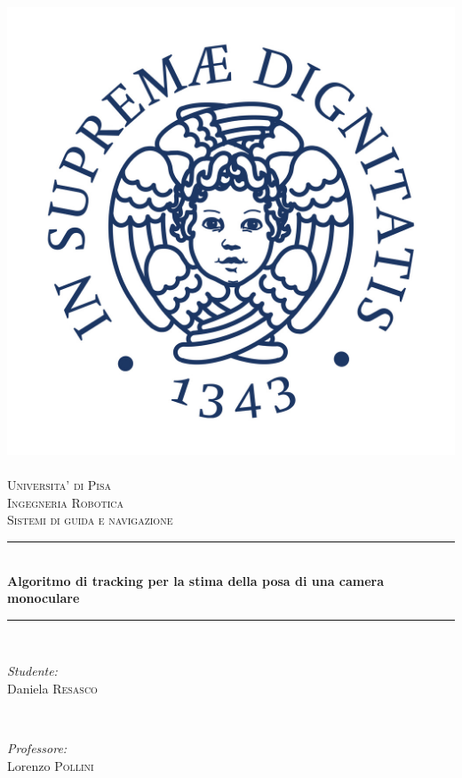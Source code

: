\documentclass[laurea,oneside,11pt]{report}
\newcommand{\HRule}{\rule{\linewidth}{0.5mm}} %
\begin{document}
\begin{titlepage}


\center %
 \includegraphics*[width=0.5\columnwidth]{Logo}~\\[.5cm]

\textsc{\LARGE Universita' di Pisa}\\[1.0cm] %
\textsc{\Large Ingegneria Robotica}\\[0.5cm] %
\textsc{\large Sistemi di guida e navigazione}\\[0.5cm] %


\HRule \\[0.3cm]
{ \huge \bfseries Algoritmo di tracking per la stima della posa di una camera monoculare}\\[0.4cm] %
\HRule \\[1.cm]
 

\begin{minipage}{0.4\textwidth}
\begin{flushleft} \large
\emph{Studente:}\\
Daniela \textsc{Resasco} %
\end{flushleft}
\end{minipage}
~
\begin{minipage}{0.4\textwidth}
\begin{flushright} \large
\emph{Professore:} \\
Lorenzo \textsc{Pollini}  %
\end{flushright}
\end{minipage}\\[4cm]


\end{titlepage}
\end{document}
